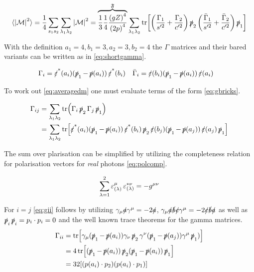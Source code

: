 \begin{equation}
  \label{eq:averagedm}
  \langle\abs{\mathcal{M}}^2\rangle = \frac{1}{4}\sum_{s_1 s_2}\sum_{\lambda_1
    \lambda_2} \abs{\mathcal{M}}^2=\overbrace{\frac{1}{3}\frac{1}{4}\frac{\qty(gZ)^4}{\qty(2p)^4}}^\mathfrak{F}\sum_{\lambda_1
    \lambda_2}\tr[\qty(\frac{\Gamma_1}{s'^2}+\frac{\Gamma_2}{c'^2})
  \ps_2\qty(\frac{\bar{\Gamma}_1}{s'^2}+\frac{\bar{\Gamma}_2}{c'^2})\ps_1]
\end{equation}

With the definition \(a_1=4,b_1=3,a_2=3,b_2=4\) the \(\Gamma\)
matrices and their bared variants can be written as in \cref{eq:shortgamma}.

\begin{align}
  \label{eq:shortgamma}
  \Gamma_i &= \pses(a_i)(\ps_1 - \ps(a_i))\pses(b_i) & \bar{\Gamma}_i &= \pes(b_i)(\ps_1 - \ps(a_i))\pes(a_i)
\end{align}

To work out \cref{eq:averagedm} one must evaluate terms of the
form \cref{eq:gbricks}.

\begin{equation}
  \label{eq:gbricks}
  \begin{split}
    \Gamma_{ij} &= \sum_{\lambda_1\lambda_2}
    \tr(\Gamma_i\ps_2\Gamma_j\ps_1)\\
    &= \sum_{\lambda_1\lambda_2}
    \tr[\pses(a_i)(\ps_1-\ps(a_i))\pses(b_i)\ps_2\pes(b_j)(\ps_1 -
    \ps(a_j))\pes(a_j)\ps_1]
  \end{split}
\end{equation}

The sum over plarisation can be simplified by utilizing the
completeness relation for polarisation vectors for \emph{real} photons
\cref{eq:polcomp}.

\begin{equation}
  \label{eq:polcomp}
  \sum_{\lambda=1}^{2}\pe_{(\lambda)}^\mu\pe_{(\lambda)}^{*\nu} = -g^{\mu\nu}
\end{equation}

For \(i=j\) \cref{eq:gii} follows by utilizing
\(\gamma_\mu\sl{a}\gamma^\mu=-2\sl{a}\),
\(\gamma_\mu\sl{a}\sl{b}\sl{c}\gamma^\mu=-2\sl{c}\sl{b}\sl{a}\) as
well as \(\ps_i\ps_i=p_i\cdot p_i = 0\) and the well known trace
theorems for the gamma matrices.
\begin{equation}
  \label{eq:gii}
  \begin{split}
\Gamma_{ii} &=
\tr[\gamma_\mu(\ps_1-\ps(a_i))\gamma_\nu\ps_2\gamma^\nu(\ps_1-\ps(a_j))\gamma^\mu\ps_1)]
\\
&= 4\tr[(\ps_1-\ps(a_i))\ps_2(\ps_1-\ps(a_i))\ps_1]\\
&= 32\qty[(p(a_i)\cdot p_2)(p(a_i)\cdot p_1)]
\end{split}
\end{equation}

